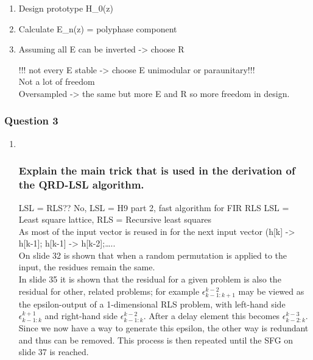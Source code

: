 \documentclass[
  a4paper,
  ,captions=tableheading
]{scrartcl}
\begin{document}
\begin{enumerate}
\def\labelenumi{\arabic{enumi})}
\item
  Design prototype H\_0(z)\\
\item
  Calculate E\_n(z) = polyphase component\\
\item
  Assuming all E can be inverted -\textgreater{} choose R

  !!! not every E stable -\textgreater{} choose E unimodular or
  paraunitary!!!\\
  Not a lot of freedom\\
  Oversampled -\textgreater{} the same but more E and R so more freedom
  in design.
\end{enumerate}

\subsubsection{Question 3}\label{question-3-5}

\begin{enumerate}
\def\labelenumi{\arabic{enumi}.}
\item ~
  \subsubsection{Explain the main trick that is used in the derivation
  of the QRD-LSL
  algorithm.}\label{explain-the-main-trick-that-is-used-in-the-derivation-of-the-qrd-lsl-algorithm.}

  LSL = RLS?? No, LSL = H9 part 2, fast algorithm for FIR RLS LSL =
  Least square lattice, RLS = Recursive least squares\\
  As most of the input vector is reused in for the next input vector
  (h{[}k{]} -\textgreater{} h{[}k-1{]}; h{[}k-1{]} -\textgreater{}
  h{[}k-2{]};\ldots..\\
  On slide 32 is shown that when a random permutation is applied to the
  input, the residues remain the same.\\
  In slide 35 it is shown that the residual for a given problem is also
  the residual for other, related problems; for example
  \(\epsilon^{k−2}_{k−1:k+1}\) may be viewed as the epsilon-output of a
  1-dimensional RLS problem, with left-hand side
  \(\epsilon^{k+1}_{k−1:k}\) and right-hand side
  \(\epsilon^{k−2}_{k−1:k}\). After a delay element this becomes
  \(\epsilon^{k-3}_{k-2:k}\). Since we now have a way to generate this
  epsilon, the other way is redundant and thus can be removed. This
  process is then repeated until the SFG on slide 37 is reached.
\end{enumerate}
\end{document}
